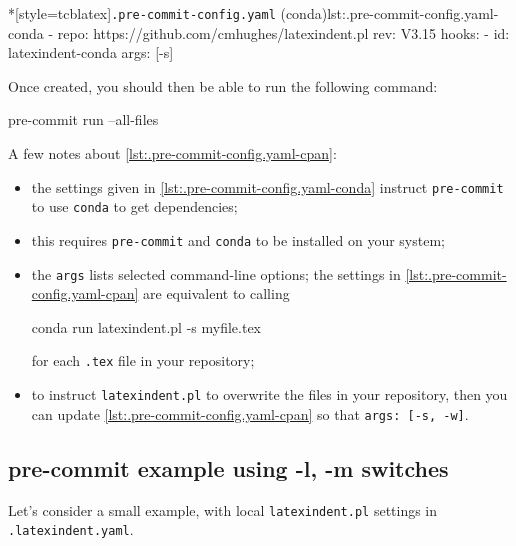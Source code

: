 		\begin{cmhlistings}*[style=tcblatex]{\texttt{.pre-commit-config.yaml} (conda)}{lst:.pre-commit-config.yaml-conda}
- repo: https://github.com/cmhughes/latexindent.pl
  rev: V3.15
  hooks:
  - id: latexindent-conda
    args: [-s]
\end{cmhlistings}
		Once created, you should then be able to run the following command:
		\begin{commandshell}
pre-commit run --all-files  
\end{commandshell}
		A few notes about \cref{lst:.pre-commit-config.yaml-cpan}:
		\begin{itemize}
			\item the settings given in \cref{lst:.pre-commit-config.yaml-conda} instruct
			      \texttt{pre-commit} to use \texttt{conda} to get dependencies;
			\item this requires \texttt{pre-commit} and \texttt{conda} to be installed on your system;
			\item the \texttt{args} lists selected command-line options; the settings in
			      \cref{lst:.pre-commit-config.yaml-cpan} are equivalent to calling
			      \begin{commandshell}
conda run latexindent.pl -s myfile.tex       
\end{commandshell}
			      for each \texttt{.tex} file in your repository;
			\item to instruct \texttt{latexindent.pl} to overwrite the files in your repository, then you
			      can update \cref{lst:.pre-commit-config.yaml-cpan} so that \texttt{args: [-s, -w]}.
		\end{itemize}

	\subsection{pre-commit example using -l, -m switches}
		Let's consider a small example, with local \texttt{latexindent.pl} settings in
		\texttt{.latexindent.yaml}.

